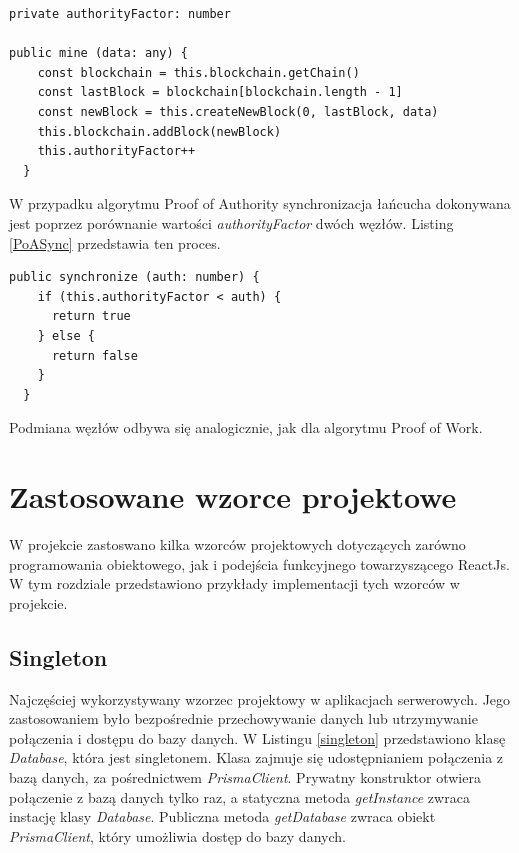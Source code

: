\documentclass[a4paper,12pt]{book}
\begin{document}
\begin{lstlisting}[style=ES6, caption={Dodawanie nowego bloku w algorytmie Proof of Authority.}, label={PoABlock}]
private authorityFactor: number

public mine (data: any) {
    const blockchain = this.blockchain.getChain()
    const lastBlock = blockchain[blockchain.length - 1]
    const newBlock = this.createNewBlock(0, lastBlock, data)
    this.blockchain.addBlock(newBlock)
    this.authorityFactor++
  }
\end{lstlisting}

W przypadku algorytmu Proof of Authority synchronizacja łańcucha dokonywana jest poprzez porównanie wartości \textit{authorityFactor} dwóch węzłów. Listing \ref{PoASync} przedstawia ten proces.

\begin{lstlisting}[style=ES6, caption={Synchronizacja w algorytmi Proof of Authority.}, label={PoASync}]
public synchronize (auth: number) {
    if (this.authorityFactor < auth) {
      return true
    } else {
      return false
    }
  }
\end{lstlisting}

Podmiana węzłów odbywa się analogicznie, jak dla algorytmu Proof of Work.
\section{Zastosowane wzorce projektowe}
W projekcie zastoswano kilka wzorców projektowych dotyczących zarówno programowania obiektowego, jak i podejścia funkcyjnego towarzyszącego ReactJs. W tym rozdziale przedstawiono przykłady implementacji tych wzorców w projekcie.

\subsection{Singleton}
Najczęściej wykorzystywany wzorzec projektowy w aplikacjach serwerowych. Jego zastosowaniem było bezpośrednie przechowywanie danych lub utrzymywanie połączenia i dostępu do bazy danych. W Listingu \ref{singleton} przedstawiono klasę \textit{Database}, która jest singletonem. Klasa zajmuje się udostępnianiem połączenia z bazą danych, za pośrednictwem \textit{PrismaClient}. Prywatny konstruktor otwiera połączenie z bazą danych tylko raz, a statyczna metoda \textit{getInstance} zwraca instację klasy \textit{Database}. Publiczna metoda \textit{getDatabase} zwraca obiekt \textit{PrismaClient}, który umożliwia dostęp do bazy danych.
\end{document}
